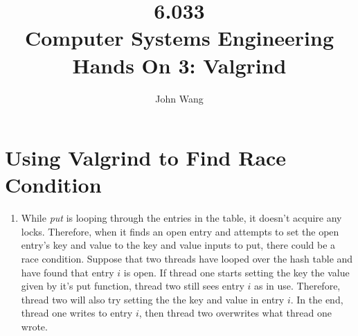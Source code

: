 \documentclass[psamsfonts]{amsart}
\title{6.033 \\
Computer Systems Engineering \\
Hands On 3: Valgrind}
\author{John Wang}
\begin{document}
\maketitle

\section{Using Valgrind to Find Race Condition}

\begin{enumerate}
  \item While \emph{put} is looping through the entries in the table, it doesn't acquire any locks. Therefore, when it finds an open entry and attempts to set the open entry's key and value to the key and value inputs to put, there could be a race condition. Suppose that two threads have looped over the hash table and have found that entry $i$ is open. If thread one starts setting the key the value given by it's put function, thread two still sees entry $i$ as in use. Therefore, thread two will also try setting the the key and value in entry $i$. In the end, thread one writes to entry $i$, then thread two overwrites what thread one wrote.

\end{enumerate}
\end{document}
